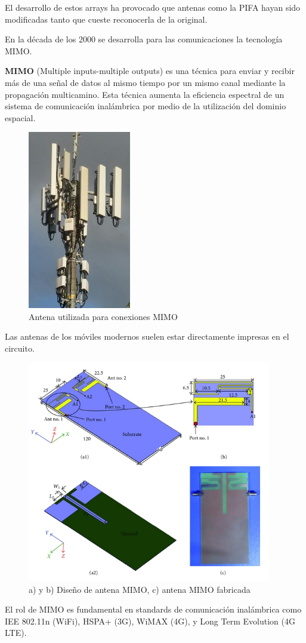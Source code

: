 \documentclass[a4paper,11pt,titlepage]{article}
\begin{document}
El desarrollo de estos arrays ha provocado que antenas como la PIFA hayan sido modificadas tanto que cueste reconocerla de la original. \par
En la década de los 2000 se desarrolla para las comunicaciones la tecnología MIMO.\par
\textbf{MIMO} (Multiple inputs-multiple outputs) es una técnica para enviar y recibir más de una señal de datos al mismo tiempo por un mismo canal mediante la propagación multicamino. Esta técnica aumenta la eficiencia espectral de un sistema de comunicación inalámbrica por medio de la utilización del dominio espacial.
\begin{figure}[H]
\centering
\includegraphics[width=0.4\textwidth]{mimo}
\caption{Antena utilizada para conexiones MIMO}
\end{figure}
Las antenas de los móviles modernos suelen estar directamente impresas en el circuito.\par
\begin{figure}[H]
\centering
\includegraphics[width=0.95\textwidth]{mimomovil}
\caption{a) y b) Diseño de antena MIMO, c) antena MIMO fabricada}
\end{figure}
El rol de MIMO es fundamental en standards de comunicación inalámbrica como IEE 802.11n (WiFi), HSPA+ (3G), WiMAX (4G), y Long Term Evolution (4G LTE).
\end{document}
